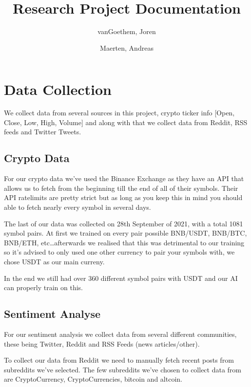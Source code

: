 \documentclass[12pt,a4paper]{article}
\begin{document}
\begin{titlepage}
    \author{
        vanGoethem, Joren
        \and
        Maerten, Andreas
    }
    \title{Research Project Documentation}
\end{titlepage}

\maketitle
\newpage
\tableofcontents
\newpage


\section{Data Collection}

We collect data from several sources in this project, crypto ticker info [Open, Close, Low, High, Volume] and along with that we collect data from Reddit, RSS feeds and Twitter Tweets.

\subsection{Crypto Data}

For our crypto data we've used the Binance Exchange as they have an API that allows us to fetch from the beginning till the end of all of their symbols.
Their API ratelimits are pretty strict but as long as you keep this in mind you should able to fetch nearly every symbol in several days.

The last of our data was collected on 28th September of 2021, with a total 1081 symbol pairs.
At first we trained on every pair possible BNB/USDT, BNB/BTC, BNB/ETH, etc\dots afterwards we realised that this was detrimental to our training so it's advised to only used one other currency to pair your symbols with, we chose USDT as our main curreny.

In the end we still had over 360 different symbol pairs with USDT and our AI can properly train on this.

\subsection{Sentiment Analyse}

For our sentiment analysis we collect data from several different communities, these being Twitter, Reddit and RSS Feeds (news articles/other).

To collect our data from Reddit we need to manually fetch recent posts from subreddits we've selected. The few subreddits we've chosen to collect data from are CryptoCurrency, CryptoCurrencies, bitcoin and altcoin.
\end{document}
